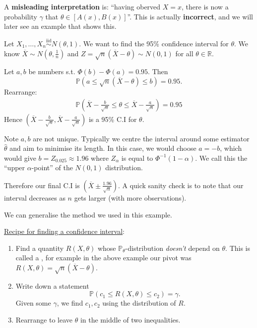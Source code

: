 \documentclass[egregdoesnotlikesansseriftitles,a4paper]{scrartcl}
\begin{document}
A \textbf{misleading interpretation} is: ``having oberved $X=x$, there is now a probability $\gamma$ that $\theta \in [A (x),B (x)]$''. This is actually \textbf{incorrect}, and we will later see an example that shows this.
\begin{example*}
      Let $X_1 , \ldots, X_n \overset{\operatorname{iid}}{\sim} N (\theta,1)$. We want to find the 95\% confidence interval for $\theta$. We know $\overline{X} \sim N (\theta, \frac{1}{n})$ and $Z=\sqrt{n}(\overline{X}-\theta)\sim N (0,1)$ for all $\theta \in \mathbb{R}$. 

      Let $a,b$ be numbers s.t. $\Phi (b)-\Phi (a)=0.95$. Then \[
      \mathbb{P}(a \leq \sqrt{n}(\overline{X}-\theta)\leq b)=0.95
      .\] Rearrange: 
      \begin{align*}
           \mathbb{P}(\overline{X}-\frac{b}{\sqrt{n}}\leq \theta \leq \overline{X}-\frac{a}{\sqrt{n}})=0.95
      \end{align*}
      Hence $(\overline{X}-\frac{b}{\sqrt{n}},\overline{X}-\frac{a}{\sqrt{n}})$ is a 95\% C.I for $\theta$. 
      
      Note $a,b$ are not unique. Typically we centre the interval around some estimator $\hat{\theta}$ and aim to minimise its length. In this case, we would choose $a=-b$, which would give $b=Z_{0.025}\approx 1.96$ where $Z_{\alpha}$ is equal to ${\Phi}^{-1}(1-\alpha)$. We call this the ``upper $\alpha$-point'' of the $N (0,1)$ distribution.

      Therefore our final C.I is $(\overline{X}\pm \frac{1.96}{\sqrt{n}})$. A quick sanity check is to note that our interval decreases as $n$ gets larger (with more observations).
\end{example*}
We can generalise the method we used in this example.
\begin{remark}
      \underline{Recipe for finding a confidence interval}:
      \begin{enumerate}
           \item Find a quantity $R (X, \theta)$ whose $\mathbb{P}_{\theta}$-distribution \emph{doesn't} depend on $\theta$. This is called a , for example in the above example our pivot was $R (X , \theta)=\sqrt{n}(\overline{X}-\theta)$.
           \item Write down a statement \[
           \mathbb{P} (c_1 \leq R (X,\theta) \leq c_2 )=\gamma
           .\] Given some $\gamma$, we find $c_1 ,c_2 $ using the distribution of $R$.
           \item Rearrange to leave $\theta$ in the middle of two inequalities.
      \end{enumerate}
\end{remark}
\end{document}
